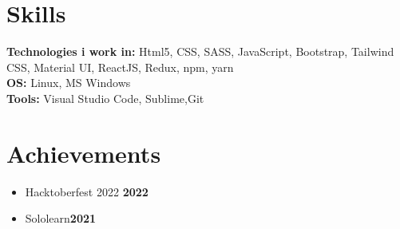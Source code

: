 \documentclass[letterpaper, 11pt]{article}
\newcommand{\secStartSpace}{\vspace{3pt}}
\newcommand{\secEndSpace}{\vspace{5pt}}
\begin{document}
\section{\color{blue} \textbf{Skills}}
\secStartSpace

\begin{addmargin}[1em]{1em}
	\noindent \textbf{Technologies i work in:} Html5, CSS, SASS, JavaScript, Bootstrap, Tailwind CSS, Material UI, ReactJS, Redux, npm, yarn \\
	\noindent \textbf{OS:} Linux, MS Windows\\
	\noindent \textbf{Tools:} Visual Studio Code, Sublime,Git
\end{addmargin}
\secEndSpace


\section{\color{blue} \textbf{Achievements}}
\secStartSpace

\begin{addmargin}[1em]{1em}
	\begin{itemize}[itemsep=-2.25pt]
		\item Hacktoberfest 2022 \hfill  \textbf{2022}
		\item Sololearn\hfill \textbf{2021}
	\end{itemize}
\end{addmargin}
\end{document}
